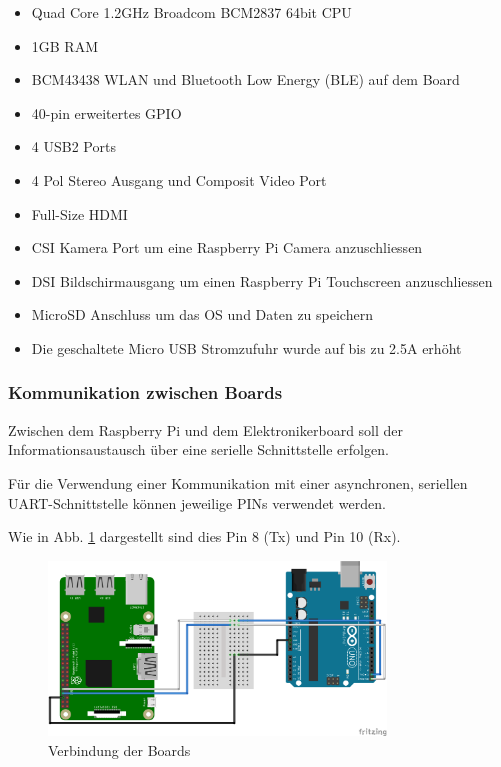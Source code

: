 \documentclass[a4paper]{report}
\begin{document}
\begin{itemize}[noitemsep]
	\item Quad Core 1.2GHz Broadcom BCM2837 64bit CPU
	\item 1GB RAM
	\item BCM43438 WLAN und Bluetooth Low Energy (BLE) auf dem Board
	\item 40-pin erweitertes GPIO
	\item 4 USB2 Ports
	\item 4 Pol Stereo Ausgang und Composit Video Port
	\item Full-Size HDMI
	\item CSI Kamera Port um eine Raspberry Pi Camera anzuschliessen
	\item DSI Bildschirmausgang um einen Raspberry Pi Touchscreen anzuschliessen
	\item MicroSD Anschluss um das OS und Daten zu speichern
	\item Die geschaltete Micro USB Stromzufuhr wurde auf bis zu 2.5A erhöht
\end{itemize}\parencite{RaspberryPiFoundation2017}

\vspace{1em}

\subsubsection{Kommunikation zwischen Boards}
\label{sssec:Kommunikation}
Zwischen dem Raspberry Pi und dem Elektronikerboard soll der Informationsaustausch über eine serielle Schnittstelle erfolgen.

Für die Verwendung einer Kommunikation mit einer asynchronen, seriellen UART-Schnittstelle können jeweilige PINs verwendet werden.

Wie in Abb. \ref{fig:RaspberryPins} dargestellt sind dies Pin 8 (Tx) und Pin 10 (Rx).
\begin{figure}[h!]
	\centering
	\includegraphics[keepaspectratio, width=0.8\textwidth]{UART_Verbindung_LLS_Steckplatine}
	\caption{Verbindung der Boards}
	\label{fig:RaspberryPins}
\end{figure}
\end{document}
